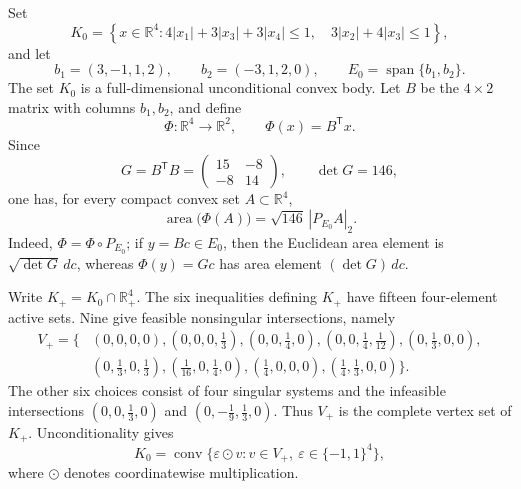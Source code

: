 \documentclass[11pt]{amsart}
\theoremstyle{remark}
\newcommand{\R}{\mathbb{R}}
\newcommand{\conv}{\operatorname{conv}}
\newcommand{\area}{\operatorname{area}}
\begin{document}
Set
\begin{equation}\label{eq:K0}
  K_0=\left\{x\in\R^4:
  4|x_1|+3|x_3|+3|x_4|\le1,\quad
  3|x_2|+4|x_3|\le1\right\},
\end{equation}
and let
\[
  b_1=(3,-1,1,2),\qquad b_2=(-3,1,2,0),\qquad
  E_0=\operatorname{span}\{b_1,b_2\}.
\]
The set $K_0$ is a full-dimensional unconditional convex body. Let $B$ be the
$4\times2$ matrix with columns $b_1,b_2$, and define
\[
  \Phi:\R^4\longrightarrow\R^2,\qquad \Phi(x)=B^{\mathsf T}x.
\]
Since
\[
  G=B^{\mathsf T}B=
  \begin{pmatrix}15&-8\\-8&14\end{pmatrix},
  \qquad \det G=146,
\]
one has, for every compact convex set $A\subset\R^4$,
\begin{equation}\label{eq:chart}
  \area\bigl(\Phi(A)\bigr)=\sqrt{146}\,|P_{E_0}A|_2.
\end{equation}
Indeed, $\Phi=\Phi\circ P_{E_0}$; if $y=Bc\in E_0$, then the Euclidean area
element is $\sqrt{\det G}\,dc$, whereas $\Phi(y)=Gc$ has area element
$(\det G)\,dc$.

Write $K_+=K_0\cap\R_+^4$. The six inequalities defining $K_+$ have fifteen
four-element active sets. Nine give feasible nonsingular intersections,
namely
\begin{align*}
V_+=\bigl\{&
(0,0,0,0),
(0,0,0,\tfrac13),
(0,0,\tfrac14,0),
(0,0,\tfrac14,\tfrac1{12}),
(0,\tfrac13,0,0),\\
&
(0,\tfrac13,0,\tfrac13),
(\tfrac1{16},0,\tfrac14,0),
(\tfrac14,0,0,0),
(\tfrac14,\tfrac13,0,0)
\bigr\}.
\end{align*}
The other six choices consist of four singular systems and the infeasible
intersections $(0,0,\tfrac13,0)$ and $(0,-\tfrac19,\tfrac13,0)$. Thus $V_+$ is
the complete vertex set of $K_+$. Unconditionality gives
\begin{equation}\label{eq:signhull}
  K_0=\conv\{\varepsilon\odot v:
  v\in V_+,\ \varepsilon\in\{-1,1\}^4\},
\end{equation}
where $\odot$ denotes coordinatewise multiplication.
\end{document}
